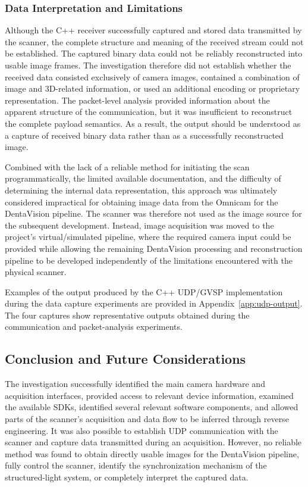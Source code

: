\subsubsection{Data Interpretation and Limitations}

Although the C++ receiver successfully captured and stored data transmitted by the scanner, the complete structure and meaning of the received stream could not be established. The captured binary data could not be reliably reconstructed into usable image frames. The investigation therefore did not establish whether the received data consisted exclusively of camera images, contained a combination of image and 3D-related information, or used an additional encoding or proprietary representation. The packet-level analysis provided information about the apparent structure of the communication, but it was insufficient to reconstruct the complete payload semantics.
As a result, the  output should be understood as a capture of received binary data rather than as a successfully reconstructed image.

Combined with the lack of a reliable method for initiating the scan programmatically, the limited available documentation, and the difficulty of determining the internal data representation, this approach was ultimately considered impractical for obtaining image data from the Omnicam for the DentaVision pipeline. The scanner was therefore not used as the image source for the subsequent development. Instead, image acquisition was moved to the project's virtual/simulated pipeline, where the required camera input could be provided while allowing the remaining DentaVision processing and reconstruction pipeline to be developed independently of the limitations encountered with the physical scanner.

Examples of the output produced by the C++ UDP/GVSP implementation during the data capture experiments are provided in Appendix~\ref{app:udp-output}. The four captures show representative outputs obtained during the communication and packet-analysis experiments.


\subsection{Conclusion and Future Considerations}

The investigation successfully identified the main camera hardware and acquisition interfaces, provided access to relevant device information, examined the available SDKs, identified several relevant software components, and allowed parts of the scanner's acquisition and data flow to be inferred through reverse engineering. It was also possible to establish UDP communication with the scanner and capture data transmitted during an acquisition. However, no reliable method was found to obtain directly usable images for the DentaVision pipeline, fully control the scanner, identify the synchronization mechanism of the structured-light system, or completely interpret the captured data.

